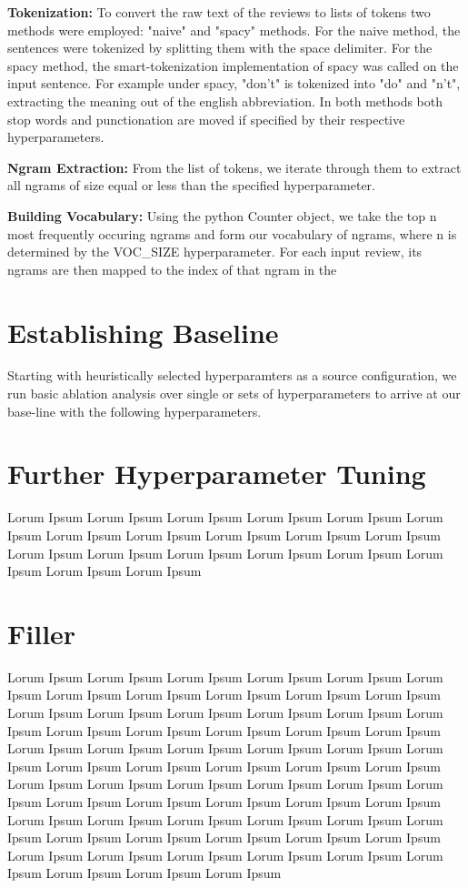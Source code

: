 \documentclass[a4paper,10pt]{article}
\begin{document}
\par
\justify
\textbf{Tokenization:} To convert the raw text of the reviews to lists of tokens two methods were employed: "naive" and "spacy" methods. For the naive method, the sentences were tokenized by splitting them with the space delimiter. For the spacy method, the smart-tokenization implementation of spacy was called on the input sentence. For example under spacy, "don't" is tokenized into "do" and "n't", extracting the meaning out of the english abbreviation. In both methods both stop words and punctionation are moved if specified by their respective hyperparameters.

\par
\justify
\textbf{Ngram Extraction:} From the list of tokens, we iterate through them to extract all ngrams of size equal or less than the specified hyperparameter. 

\par
\justify
\textbf{Building Vocabulary:} Using the python Counter object, we take the top n most frequently occuring ngrams and form our vocabulary of ngrams, where n is determined by the VOC\_SIZE hyperparameter. For each input review, its ngrams are then mapped to the index of that ngram in the


\section{Establishing Baseline}
Starting with heuristically selected hyperparamters as a source configuration, we run basic ablation analysis over single or sets of hyperparameters to arrive at our base-line with the following hyperparameters.

\section{Further Hyperparameter Tuning}
Lorum Ipsum Lorum Ipsum Lorum Ipsum Lorum Ipsum Lorum Ipsum Lorum Ipsum Lorum Ipsum Lorum Ipsum Lorum Ipsum Lorum Ipsum Lorum Ipsum Lorum Ipsum Lorum Ipsum Lorum Ipsum Lorum Ipsum Lorum Ipsum Lorum Ipsum Lorum Ipsum Lorum Ipsum 

\section{Filler}
Lorum Ipsum Lorum Ipsum Lorum Ipsum Lorum Ipsum Lorum Ipsum Lorum Ipsum Lorum Ipsum Lorum Ipsum Lorum Ipsum Lorum Ipsum Lorum Ipsum Lorum Ipsum Lorum Ipsum Lorum Ipsum Lorum Ipsum Lorum Ipsum Lorum Ipsum Lorum Ipsum Lorum Ipsum Lorum Ipsum Lorum Ipsum Lorum Ipsum Lorum Ipsum Lorum Ipsum Lorum Ipsum Lorum Ipsum Lorum Ipsum Lorum Ipsum Lorum Ipsum Lorum Ipsum Lorum Ipsum Lorum Ipsum Lorum Ipsum Lorum Ipsum Lorum Ipsum Lorum Ipsum Lorum Ipsum Lorum Ipsum Lorum Ipsum Lorum Ipsum Lorum Ipsum Lorum Ipsum Lorum Ipsum Lorum Ipsum Lorum Ipsum Lorum Ipsum Lorum Ipsum Lorum Ipsum Lorum Ipsum Lorum Ipsum Lorum Ipsum Lorum Ipsum Lorum Ipsum Lorum Ipsum Lorum Ipsum Lorum Ipsum Lorum Ipsum Lorum Ipsum Lorum Ipsum Lorum Ipsum Lorum Ipsum Lorum Ipsum Lorum Ipsum Lorum Ipsum 

\medskip


\end{document}

